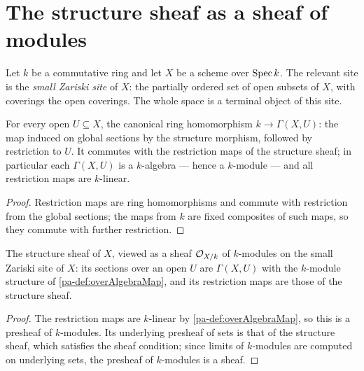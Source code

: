 \section{The structure sheaf as a sheaf of modules}

Let \(k\) be a commutative ring and let \(X\) be a scheme over \(\operatorname{Spec} k\). The relevant site
is the \emph{small Zariski site} of \(X\): the partially ordered set of open subsets of
\(X\), with coverings the open coverings. The whole space is a terminal object of this site.

\begin{definition}
  \label{pa-def:overAlgebraMap}
  \leanok

  For every open \(U \subseteq X\), the canonical ring homomorphism \(k \to \Gamma(X, U)\):
  the map induced on global sections by the structure morphism, followed by restriction to
  \(U\). It commutes with the restriction maps of the structure sheaf; in particular each
  \(\Gamma(X, U)\) is a \(k\)-algebra --- hence a \(k\)-module --- and all restriction maps
  are \(k\)-linear.
\end{definition}
\begin{proof}
  \leanok
  Restriction maps are ring homomorphisms and commute with restriction from the global
  sections; the maps from \(k\) are fixed composites of such maps, so they commute with
  further restriction.
\end{proof}

\begin{definition}
  \label{pa-def:moduleKSheaf}
  \leanok

  The structure sheaf of \(X\), viewed as a sheaf \(\mathcal{O}_{X/k}\) of \(k\)-modules on the
  small Zariski site of \(X\): its sections over an open \(U\) are \(\Gamma(X, U)\) with the
  \(k\)-module structure of \ref{pa-def:overAlgebraMap}, and its restriction maps are those of
  the structure sheaf.
\end{definition}
\begin{proof}
  \leanok
  The restriction maps are \(k\)-linear by \ref{pa-def:overAlgebraMap}, so this is a presheaf of
  \(k\)-modules. Its underlying presheaf of sets is that of the structure sheaf, which
  satisfies the sheaf condition; since limits of \(k\)-modules are computed on underlying
  sets, the presheaf of \(k\)-modules is a sheaf.
\end{proof}


